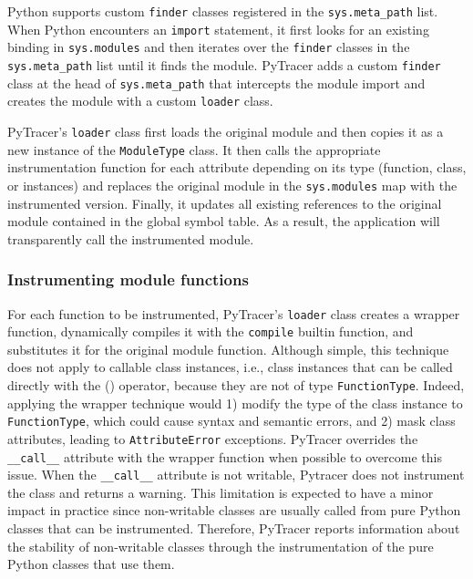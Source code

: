 \documentclass[10pt,journal,compsoc]{IEEEtran}
\newcommand{\pytracer}[0]{PyTracer\xspace}
\begin{document}
Python supports custom \texttt{finder} classes registered in the
\texttt{sys.meta\_path} list. When Python encounters an \texttt{import}
statement, it first looks for an existing binding in \texttt{sys.modules} and
then iterates over the \texttt{finder} classes in the \texttt{sys.meta\_path}
list until it finds the module. \pytracer adds a custom \texttt{finder} class at
the head of \texttt{sys.meta\_path} that intercepts the module import and
creates the module with a custom \texttt{loader} class.

\pytracer's \texttt{loader} class first loads the original module and then
copies it as a new instance of the \texttt{ModuleType} class. It then calls the
appropriate instrumentation function for each attribute depending on its type
(function, class, or instances) and replaces the original module in the
\texttt{sys.modules} map with the instrumented version. Finally, it updates all
existing references to the original module contained in the global symbol table.
As a result, the application will transparently call the instrumented module.

\subsubsection{Instrumenting module functions}

For each function to be instrumented, \pytracer's \texttt{loader} class creates
a wrapper function, dynamically compiles it with the \texttt{compile} builtin
function, and substitutes it for the original module function.  Although simple,
this technique does not apply to callable class instances, i.e., class instances
that can be called directly with the () operator, because they are not of type
\texttt{FunctionType}. Indeed, applying the wrapper technique would 1) modify
the type of the class instance to \texttt{FunctionType}, which could cause
syntax and semantic errors, and 2) mask class attributes, leading to
\texttt{AttributeError} exceptions. \pytracer overrides the
\texttt{\_\_call\_\_} attribute with the wrapper function when possible to
overcome this issue. When the \texttt{\_\_call\_\_} attribute is not writable,
Pytracer does not instrument the class and returns a warning. This limitation is
expected to have a minor impact in practice since non-writable classes are
usually called from pure Python classes that can be instrumented. Therefore,
\pytracer reports information about the stability of non-writable classes
through the instrumentation of the pure Python classes that use them.
\end{document}
